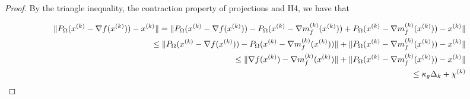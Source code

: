 \begin{proof}
By the triangle inequality, the contraction property of projections and H4, we have that

\begin{align*}
\|P_{\Omega}({x}^{(k)} - \nabla f({x}^{(k)})) - {x}^{(k)} \| = \|P_{\Omega}({x}^{(k)} - \nabla f({x}^{(k)})) - P_{\Omega}({x}^{(k)} - {\nabla m_f^{(k)}(x^{(k)})}) + P_{\Omega}({x}^{(k)} - {\nabla m_f^{(k)}(x^{(k)})}) - {x}^{(k)}\| \\
\le \|P_{\Omega}({x}^{(k)} - \nabla f({x}^{(k)})) - P_{\Omega}({x}^{(k)} - {\nabla m_f^{(k)}(x^{(k)})})\| + \|P_{\Omega}({x}^{(k)} - {\nabla m_f^{(k)}(x^{(k)})}) - {x}^{(k)}\| \\
\le \|\nabla f({x}^{(k)}) - {\nabla m_f^{(k)}(x^{(k)})}\| + \|P_{\Omega}({x}^{(k)} - {\nabla m_f^{(k)}(x^{(k)})}) - {x}^{(k)}\| \\
\le \kappa_{g} \Delta_k + {\chi^{(k)}}
\end{align*}

\end{proof}



